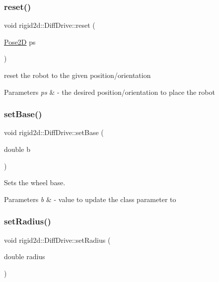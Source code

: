 \subsubsection{\texorpdfstring{reset()}{reset()}}
{\footnotesize\ttfamily void rigid2d\+::\+Diff\+Drive\+::reset (\begin{DoxyParamCaption}\item[{\hyperlink{structrigid2d_1_1Pose2D}{Pose2D}}]{ps }\end{DoxyParamCaption})}



reset the robot to the given position/orientation 


\begin{DoxyParams}{Parameters}
{\em ps} & -\/ the desired position/orientation to place the robot \\
\hline
\end{DoxyParams}
\mbox{\label{classrigid2d_1_1DiffDrive_aed9b82741312243d9ea1f705afc372dc}} 
\subsubsection{\texorpdfstring{set\+Base()}{setBase()}}
{\footnotesize\ttfamily void rigid2d\+::\+Diff\+Drive\+::set\+Base (\begin{DoxyParamCaption}\item[{double}]{b }\end{DoxyParamCaption})}



Sets the wheel base. 


\begin{DoxyParams}{Parameters}
{\em b} & -\/ value to update the class parameter to \\
\hline
\end{DoxyParams}
\mbox{\label{classrigid2d_1_1DiffDrive_adc465e5cf9027ffb207a3775800d2033}} 
\subsubsection{\texorpdfstring{set\+Radius()}{setRadius()}}
{\footnotesize\ttfamily void rigid2d\+::\+Diff\+Drive\+::set\+Radius (\begin{DoxyParamCaption}\item[{double}]{radius }\end{DoxyParamCaption})}



